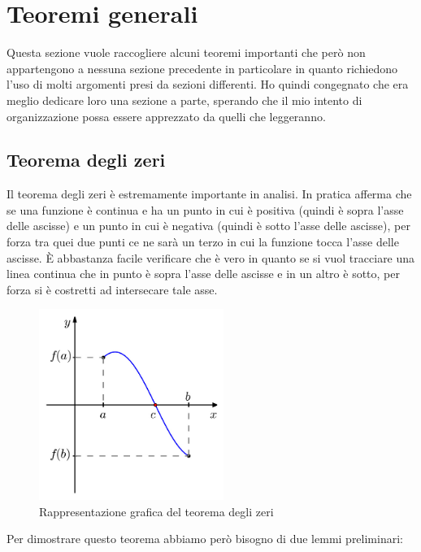 \section{Teoremi generali}
Questa sezione vuole raccogliere alcuni teoremi importanti che però non appartengono a nessuna sezione precedente in particolare in quanto richiedono l'uso di molti argomenti presi da sezioni differenti. Ho quindi congegnato che era meglio dedicare loro una sezione a parte, sperando che il mio intento di organizzazione possa essere apprezzato da quelli che leggeranno.

\subsection{Teorema degli zeri}
Il teorema degli zeri è estremamente importante in analisi. In pratica afferma che se una funzione è continua e ha un punto in cui è positiva (quindi è sopra l'asse delle ascisse) e un punto in cui è negativa (quindi è sotto l'asse delle ascisse), per forza tra quei due punti ce ne sarà un terzo in cui la funzione tocca l'asse delle ascisse. È abbastanza facile verificare che è vero in quanto se si vuol tracciare una linea continua che in punto è sopra l'asse delle ascisse e in un altro è sotto, per forza si è costretti ad intersecare tale asse.
\begin{figure}[h]
    \centering
	\includegraphics[width=6cm]{../img/TeoremaZeri.jpg}
    \caption{Rappresentazione grafica del teorema degli zeri}
\end{figure}
Per dimostrare questo teorema abbiamo però bisogno di due lemmi preliminari:

